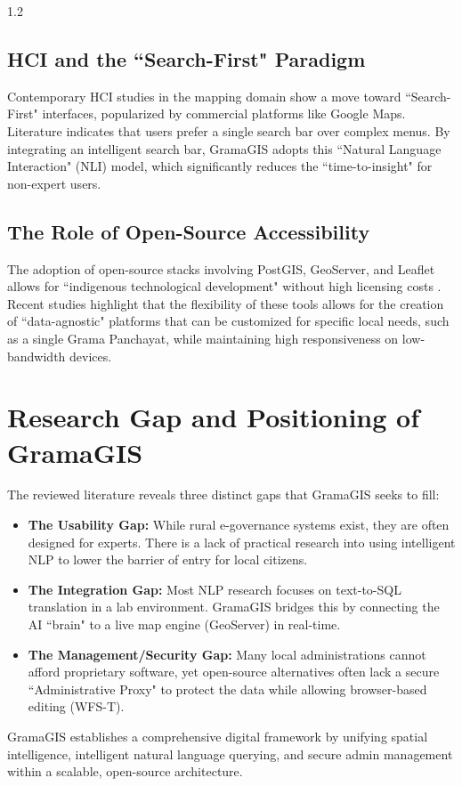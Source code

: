 \begin{spacing}{1.2}
\subsection{HCI and the ``Search-First" Paradigm}
Contemporary HCI studies in the mapping domain show a move toward ``Search-First" interfaces, popularized by commercial platforms like Google Maps. Literature indicates that users prefer a single search bar over complex menus. By integrating an intelligent search bar, GramaGIS adopts this ``Natural Language Interaction" (NLI) model, which significantly reduces the ``time-to-insight" for non-expert users.



\subsection{The Role of Open-Source Accessibility}
The adoption of open-source stacks involving PostGIS, GeoServer, and Leaflet allows for ``indigenous technological development" without high licensing costs \cite{fu2020webgis}. Recent studies highlight that the flexibility of these tools allows for the creation of ``data-agnostic" platforms that can be customized for specific local needs, such as a single Grama Panchayat, while maintaining high responsiveness on low-bandwidth devices.

\section{Research Gap and Positioning of GramaGIS}

The reviewed literature reveals three distinct gaps that GramaGIS seeks to fill:

\begin{itemize}
    \item \textbf{The Usability Gap:} While rural e-governance systems exist, they are often designed for experts. There is a lack of practical research into using intelligent NLP to lower the barrier of entry for local citizens.
    \item \textbf{The Integration Gap:} Most NLP research focuses on text-to-SQL translation in a lab environment. GramaGIS bridges this by connecting the AI ``brain" to a live map engine (GeoServer) in real-time.
    \item \textbf{The Management/Security Gap:} Many local administrations cannot afford proprietary software, yet open-source alternatives often lack a secure ``Administrative Proxy" to protect the data while allowing browser-based editing (WFS-T).
\end{itemize}

GramaGIS establishes a comprehensive digital framework by unifying spatial intelligence, intelligent natural language querying, and secure admin management within a scalable, open-source architecture.

\end{spacing}